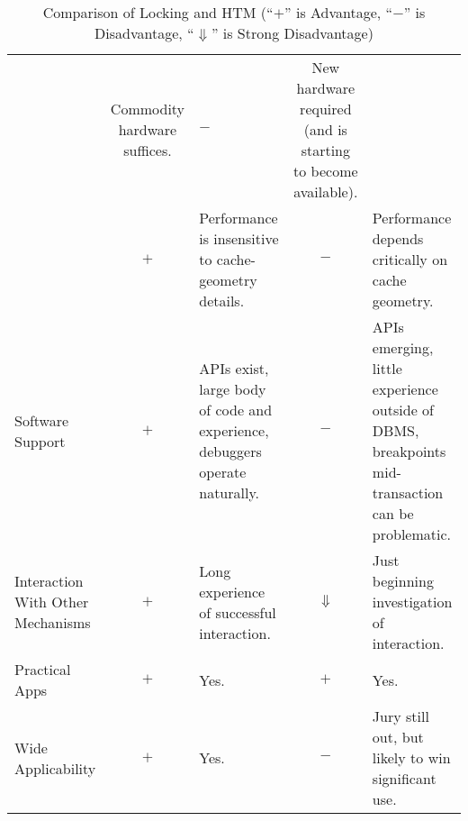 \begin{table*}[p]
\begin{tabular}{p{1.0in}||c|p{2.0in}||c|p{2.0in}}
	& Commodity hardware suffices.
		& $-$
		& New hardware required (and is starting to become
		  available). \\
\cline{2-5}
	& $+$
	& Performance is insensitive to cache-geometry details.
		& $-$
		& Performance depends critically on cache geometry. \\
\hline
Software Support
	& $+$
	& APIs exist, large body of code and experience, debuggers operate
	  naturally.
		& $-$
		& APIs emerging, little experience outside of DBMS,
		  breakpoints mid-transaction can be problematic. \\
\hline
Interaction With Other Mechanisms
	& $+$
	& Long experience of successful interaction.
		& $\Downarrow$
		& Just beginning investigation of interaction. \\
\hline
Practical Apps
	& $+$
	& Yes.
		& $+$
		& Yes. \\
\hline
Wide Applicability
	& $+$
	& Yes.
		& $-$
		& Jury still out, but likely to win significant use. \\
\end{tabular}
\caption{Comparison of Locking and HTM (``$+$'' is Advantage, ``$-$'' is Disadvantage, ``$\Downarrow$'' is Strong Disadvantage)}
\label{tab:future:Comparison of Locking and HTM}
\end{table*}
